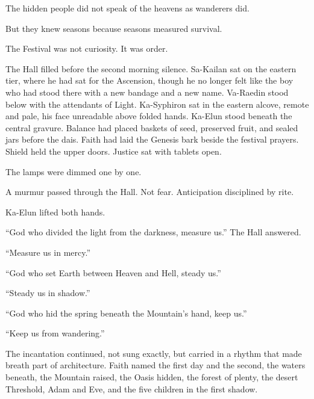 The hidden people did not speak of the heavens as wanderers did.\par

But they knew seasons because seasons measured survival.\par

The Festival was not curiosity. It was order.\par

The Hall filled before the second morning silence. Sa-Kailan sat on the eastern tier, where he had sat for the Ascension, though he no longer felt like the boy who had stood there with a new bandage and a new name. Va-Raedin stood below with the attendants of Light. Ka-Syphiron sat in the eastern alcove, remote and pale, his face unreadable above folded hands. Ka-Elun stood beneath the central gravure. Balance had placed baskets of seed, preserved fruit, and sealed jars before the dais. Faith had laid the Genesis bark beside the festival prayers. Shield held the upper doors. Justice sat with tablets open.\par

The lamps were dimmed one by one.\par

A murmur passed through the Hall. Not fear. Anticipation disciplined by rite.\par

Ka-Elun lifted both hands.\par

\begin{scripture}
“God who divided the light from the darkness, measure us.” The Hall answered.
\end{scripture}

“Measure us in mercy.”\par

\begin{scripture}
“God who set Earth between Heaven and Hell, steady us.”
\end{scripture}

“Steady us in shadow.”\par

\begin{scripture}
“God who hid the spring beneath the Mountain’s hand, keep us.”
\end{scripture}

“Keep us from wandering.”\par

The incantation continued, not sung exactly, but carried in a rhythm that made breath part of architecture. Faith named the first day and the second, the waters beneath, the Mountain raised, the Oasis hidden, the forest of plenty, the desert Threshold, Adam and Eve, and the five children in the first shadow.\par

